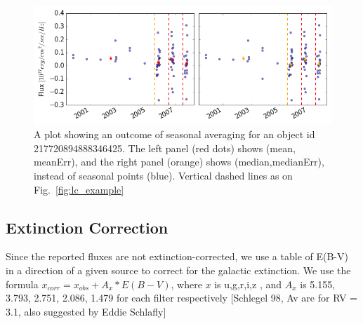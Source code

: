 \documentclass[fleqn,usenatbib]{mnras}  %
\begin{document}
\begin{figure}
\label{fig:lc_example_seasonal}
 \includegraphics[width=\textwidth]{Lightcurve_full_seasonal_obj_217720894888346425.png}
 \cprotect\caption{A plot showing an outcome of seasonal averaging for an object id 217720894888346425. The left panel (red dots) shows  (mean, meanErr),  and the right panel (orange) shows (median,medianErr), instead of seasonal points (blue). Vertical dashed lines as on Fig.~\ref{fig:lc_example}}
\end{figure}



\subsection{Extinction Correction}

Since the reported fluxes are not extinction-corrected, we use a table of E(B-V) in a direction of a given source to correct for the galactic extinction. We use the formula  $x_{corr}  = x_{obs} + A_{x} * E(B-V)$, where $x$ is  u,g,r,i,z , and $A_x$ is 5.155, 3.793, 2.751, 2.086, 1.479  for each filter respectively  [Schlegel 98, Av are for RV = 3.1, also suggested by Eddie Schlafly] 
\end{document}
